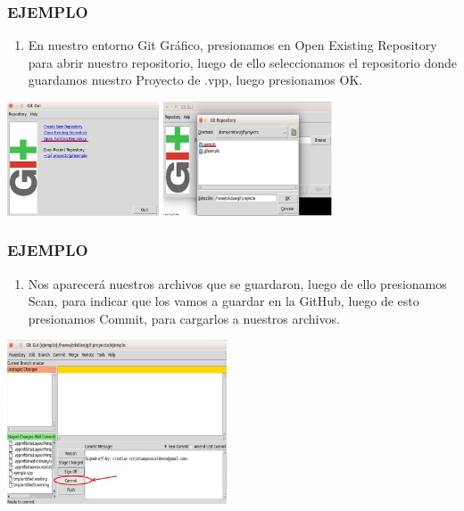 \documentclass[8pt]{beamer}
\begin{document}
\begin{frame}
\frametitle{EJEMPLO}
\begin{enumerate}[11. ]
	\justifying
    \item En nuestro entorno Git Gráfico, presionamos en Open Existing Repository para abrir nuestro repositorio, luego de ello seleccionamos el repositorio donde guardamos nuestro Proyecto de .vpp, luego presionamos OK.\\
\end{enumerate}
\begin{center}
\includegraphics[width=4.5cm]{img/b15}
\includegraphics[width=5cm]{img/b16}\\
\fontsize{6}{1}
\end{center}
\end{frame}

\begin{frame}
\frametitle{EJEMPLO}
\begin{enumerate}[12. ]
	\justifying
    \item Nos aparecerá nuestros archivos que se guardaron, luego de ello presionamos Scan, para indicar que los vamos a guardar en la GitHub, luego de esto presionamos Commit, para cargarlos a nuestros archivos.\\
\end{enumerate}
\begin{center}
\includegraphics[width=6.5cm]{img/b18}\\
\fontsize{6}{1}
\end{center}
\end{frame}
\end{document}

